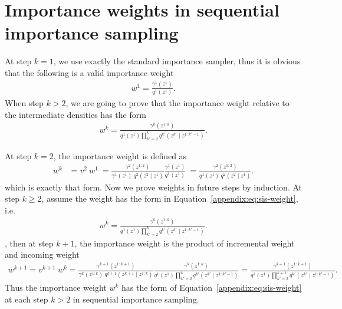 \documentclass{article}
\theoremstyle{definition}
\begin{document}
\section{Importance weights in sequential importance sampling}
\label{appendix:sis-weight}
At step $k=1$, we use exactly the standard importance sampler, thus it is obvious that the following is a valid importance weight
\begin{align*}
    w^1 = \frac{\gamma^1(z^1)}{q^1(z^1)}.
\end{align*}
When step $k>2$, we are going to prove that the importance weight relative to the intermediate densities has the form
\begin{align}
    \label{appendix:eq:sis-weight}
    w^k
    = 
    \frac{\gamma^k(z^{1:k})}
         {q^1(z^1) \prod_{k'=2}^k q^{k'}(z^{k'} \mid z^{1:k'-1})}.
\end{align}

At step $k=2$, the importance weight is defined as 
\begin{align*}
    w^k 
    &= 
    v^{2} \: w^1
    \: =
    \frac{\gamma^2(z^{1:2})}{\gamma^{1}(z^{1})\:q^2(z^2 \mid z^{1})} \frac{\gamma^1(z^1)}{q^1(z^1)}
    \: = \frac{\gamma^2(z^{1:2})}{q^1(z^1) \: q^2(z^2 \mid z^{1})}.
\end{align*}
which is exactly that form. Now we prove weights in future steps by induction. At step $k\geq 2$, assume the weight has the form in Equation~\ref{appendix:eq:sis-weight}, i.e.
\begin{align*}
    w^k
    = 
    \frac{\gamma^k(z^{1:k})}
         {q^1(z^1) \prod_{k'=2}^k q^{k'}(z^{k'} \mid z^{1:k'-1})}.    
\end{align*}
, then at step $k+1$, the importance weight is the product of incremental weight and incoming weight 
\begin{align*}
    w^{k+1}
    =
    v^{k+1} \: w^k
    =
    \frac{\gamma^{k+1}(z^{1:k+1})}{\gamma^{k}(z^{1:k})\:q^{k+1}(z^{k+1} \mid z^{1:k})}
    \frac{\gamma^k(z^{1:k})}
         {q^1(z^1) \prod_{k'=2}^k q^{k'}(z^{k'} \mid z^{1:k'-1})}
    =
    \frac{\gamma^{k+1}(z^{1:k+1})}{q^1(z^1) \prod_{k'=2}^{k+1} q^{k'}(z^{k'} \mid z^{1:k'-1})}
    .    
\end{align*}
Thus the importance weight $w^k$ has the form of Equation~\ref{appendix:eq:sis-weight} at each step $k>2$ in sequential importance sampling.
\end{document}
